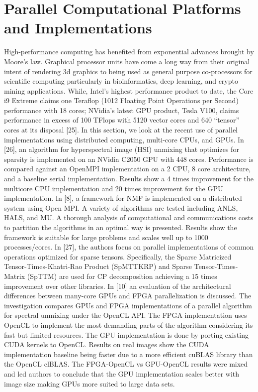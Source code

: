 \section{Parallel Computational Platforms and Implementations}
High-performance computing has benefited from exponential advances brought by Moore’s law.  Graphical processor units have come a long way from their original intent of rendering 3d graphics to being used as general purpose co-processors for scientific computing particularly in bioinformatics, deep learning, and crypto mining applications.  While, Intel’s highest performance product to date, the Core i9 Extreme claims one Teraflop (1012 Floating Point Operations per Second) performance with 18 cores; NVidia’s latest GPU product, Tesla V100, claims performance in excess of 100 TFlops with 5120 vector cores and 640 “tensor” cores at its disposal [25].  In this section, we look at the recent use of parallel implementations using distributed computing, multi-core CPUs, and GPUs.
In [26], an algorithm for hyperspectral image (HSI) unmixing that optimizes for sparsity is implemented on an NVidia C2050 GPU with 448 cores.  Performance is compared against an OpenMPI implementation on a 2 CPU, 8 core architecture, and a baseline serial implementation.  Results show a 4 times improvement for the multicore CPU implementation and 20 times improvement for the GPU implementation.
In [8], a framework for NMF is implemented on a distributed system using Open MPI.  A variety of algorithms are tested including ANLS, HALS, and MU.  A thorough analysis of computational and communications costs to partition the algorithms in an optimal way is presented.  Results show the framework is suitable for large problems and scales well up to 1000 processes/cores.
In [27], the authors focus on parallel implementations of common operations optimized for sparse tensors.  Specifically, the Sparse Matricized Tensor-Times-Khatri-Rao Product (SpMTTKRP) and Sparse Tensor-Times-Matrix (SpTTM) are used for CP decomposition achieving a 15 times improvement over other libraries.
In [10] an evaluation of the architectural differences between many-core GPUs and FPGA parallelization is discussed.  The investigation compares GPUs and FPGA implementations of a parallel algorithm for spectral unmixing under the OpenCL API.  The FPGA implementation uses OpenCL to implement the most demanding parts of the algorithm considering its fast but limited resources.  The GPU implementation is done by porting existing CUDA kernels to OpenCL.  Results on real images show the CUDA implementation baseline being faster due to a more efficient cuBLAS library than the OpenCL clBLAS.  The FPGA-OpenCL vs GPU-OpenCL results were mixed and led authors to conclude that the GPU implementation scales better with image size making GPUs more suited to large data sets.

